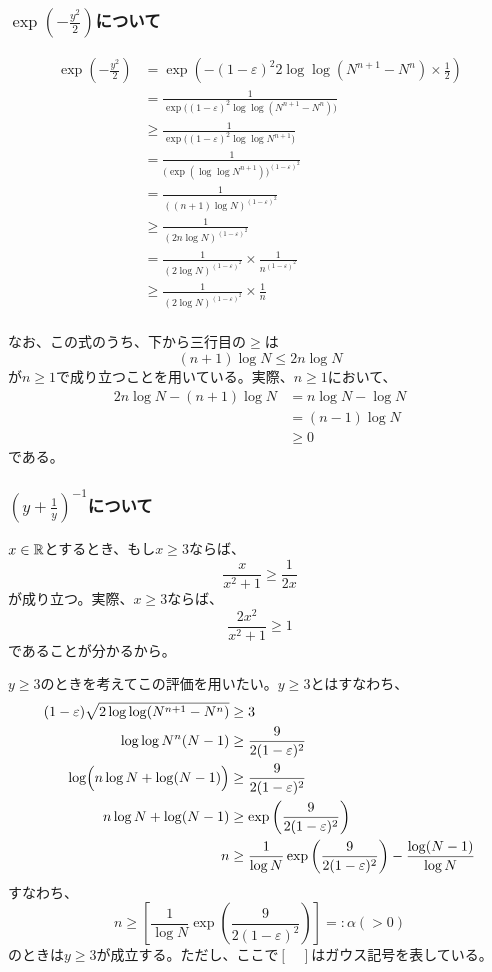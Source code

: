    \subsubsection{$\exp (-\frac{y^2}{2})$について}
      \begin{align*}
        \exp\left(-\frac{y^2}{2}\right) &= \exp\left(-(1-\varepsilon)^2 2\log\log(N^{n+1} - N^n)\times\frac{1}{2}\right)\\
        &= \frac{1}{\exp\bigl((1-\varepsilon)^2\log\log (N^{n+1} - N^n)\bigr)}\\
        &\ge \frac{1}{\exp\bigl((1-\varepsilon)^2\log\log N^{n+1}\bigr)}\\
        &= \frac{1}{\bigl(\exp(\log\log N^{n+1})\bigr)^{(1-\varepsilon)^2}}\\
        &= \frac{1}{((n+1)\log N)^{(1-\varepsilon)^2}}\\
        &\ge \frac{1}{(2n\log N)^{(1-\varepsilon)^2}}\\
        &= \frac{1}{(2\log N)^{(1-\varepsilon)^2}} \times \frac{1}{n^{(1-\varepsilon)^2}}\\
        &\ge \frac{1}{(2\log N)^{(1-\varepsilon)^2}} \times \frac{1}{n}\\
      \end{align*}

      なお、この式のうち、下から三行目の$\ge$は
      \[(n+1) \log N \leq 2n\log N\]
      が$n\ge1$で成り立つことを用いている。実際、$n\ge1$において、
      \begin{align*}
        2n\log N - (n+1) \log N &= n\log N - \log N\\
        &= (n-1)\log N \\
        &\ge 0
      \end{align*}
      である。

    \subsubsection{$\left( y + \frac{1}{y} \right)^{-1}$について}
      $x \in {\mathbb{R}}$とするとき、もし$x \ge 3$ならば、
      \[\frac{x}{x^2 + 1} \ge \frac{1}{2x}\]
      が成り立つ。実際、$x\ge3$ならば、
      \[\frac{2x^2}{x^2 + 1} \ge 1\]
      であることが分かるから。

      $y\ge 3$のときを考えてこの評価を用いたい。$y \ge 3$とはすなわち、
      \begin{align*}
        (1 - \varepsilon)\sqrt{2\log\log(N^{n+1} - N^n)} &\ge 3\\
        \log\log N^n(N-1) &\ge \frac{9}{2(1- \varepsilon)^2}\\
        \log\Bigl(n\log N + \log(N-1) \Bigr) &\ge \frac{9}{2(1- \varepsilon)^2}\\
        n\log N +\log(N-1) &\ge \exp\left(\frac{9}{2(1- \varepsilon)^2}\right) \\
        n &\ge \frac{1}{\log N} \exp\left(\frac{9}{2(1- \varepsilon)^2}\right) - \frac{\log(N-1)}{\log N}
      \end{align*}
      すなわち、
      \[n \ge \left[ \frac{1}{\log N} \exp\left(\frac{9}{2(1- \varepsilon)^2}\right) \right] =\colon \alpha(>0)\]
      のときは$y \ge 3$が成立する。ただし、ここで$[\quad]$はガウス記号を表している。

